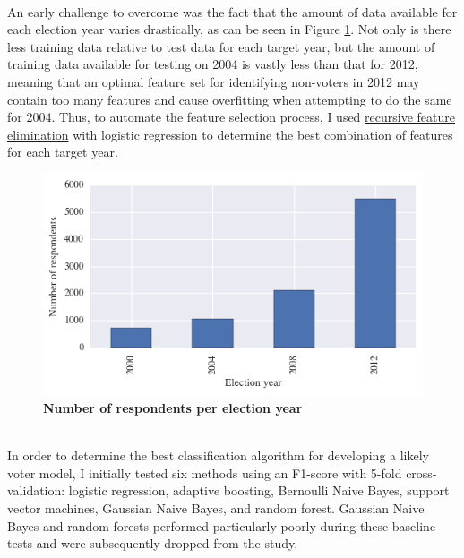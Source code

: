 \documentclass{article}
\begin{document}
	\hfill \\
	An early challenge to overcome was the fact that the amount of data available for each election year varies drastically, as can be seen in Figure \ref{fig:num_respondents_by_year}. Not only is there less training data relative to test data for each target year, but the amount of training data available for testing on 2004 is vastly less than that for 2012, meaning that an optimal feature set for identifying non-voters in 2012 may contain too many features and cause overfitting when attempting to do the same for 2004. Thus, to automate the feature selection process, I used \href{http://scikit-learn.org/stable/modules/generated/sklearn.feature_selection.RFECV.html}{recursive feature elimination} with logistic regression to determine the best combination of features for each target year.\\
	\begin{figure}[h!]
		\begin{center}
			\includegraphics*[width=0.6\linewidth]{num_respondents_by_year}
			\caption{\textbf{Number of respondents per election year}}
			\label{fig:num_respondents_by_year}
		\end{center}
	\end{figure}
	\hfill \\
	In order to determine the best classification algorithm for developing a likely voter model, I initially tested six methods using an F1-score with 5-fold cross-validation: logistic regression, adaptive boosting, Bernoulli Naive Bayes, support vector machines, Gaussian Naive Bayes, and random forest. Gaussian Naive Bayes and random forests performed particularly poorly during these baseline tests and were subsequently dropped from the study.
	
\end{document}
